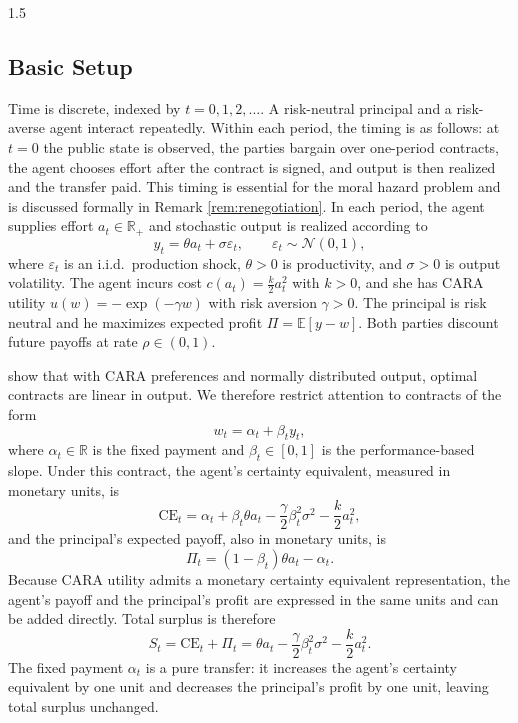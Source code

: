 \documentclass[12pt]{article}
\theoremstyle{definition}
\theoremstyle{plain}
\begin{document}
\begin{spacing}{1.5}
\subsection{Basic Setup}\label{subsec:setup}
Time is discrete, indexed by $t = 0,1,2,\dots$. A risk-neutral principal and a risk-averse agent interact repeatedly. Within each period, the timing is as follows: at $t=0$ the public state is observed, the parties bargain over one-period contracts, the agent chooses effort after the contract is signed, and output is then realized and the transfer paid. This timing is essential for the moral hazard problem and is discussed formally in Remark \ref{rem:renegotiation}. In each period, the agent supplies effort $a_t \in \mathbb{R}_+$ and stochastic output is realized according to
\[
y_t = \theta a_t + \sigma \varepsilon_t, \qquad \varepsilon_t \sim \mathcal{N}(0,1),
\]
where $\varepsilon_t$ is an i.i.d.\ production shock, $\theta > 0$ is productivity, and $\sigma > 0$ is output volatility. The agent incurs cost $c(a_t) = \frac{k}{2}a_t^2$ with $k > 0$, and she has CARA utility $u(w) = -\exp(-\gamma w)$ with risk aversion $\gamma > 0$. The principal is risk neutral and he maximizes expected profit $\Pi = \mathbb{E}[y - w]$. Both parties discount future payoffs at rate $\rho \in (0,1)$.

\textcite{holmstrom1987} show that with CARA preferences and normally distributed output, optimal contracts are linear in output. We therefore restrict attention to contracts of the form
\[
w_t = \alpha_t + \beta_t y_t,
\]
where $\alpha_t \in \mathbb{R}$ is the fixed payment and $\beta_t \in [0,1]$ is the performance-based slope. Under this contract, the agent's certainty equivalent, measured in monetary units, is
\[
\text{CE}_t = \alpha_t + \beta_t \theta a_t - \frac{\gamma}{2}\beta_t^2 \sigma^2 - \frac{k}{2}a_t^2,
\]
and the principal's expected payoff, also in monetary units, is
\[
\Pi_t = (1-\beta_t)\theta a_t - \alpha_t.
\]
Because CARA utility admits a monetary certainty equivalent representation, the agent's payoff and the principal's profit are expressed in the same units and can be added directly. Total surplus is therefore
\[
S_t = \text{CE}_t + \Pi_t = \theta a_t - \frac{\gamma}{2}\beta_t^2 \sigma^2 - \frac{k}{2}a_t^2.
\]
The fixed payment $\alpha_t$ is a pure transfer: it increases the agent's certainty equivalent by one unit and decreases the principal's profit by one unit, leaving total surplus unchanged.


\end{spacing}
\end{document}
